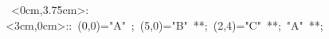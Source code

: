 \hbox{
\xy    <0cm,3.75cm>:<3cm,0cm>::
       (0,0)="A" ; (5,0)="B" **\dir{-}; 
       (2,4)="C" **\dir{-}; "A" **\dir{-};
       \endxy}
	   
